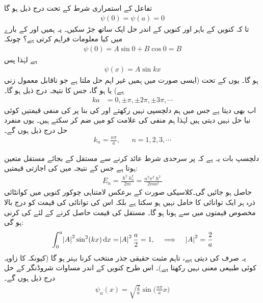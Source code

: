 تفاعل  کے استمراری شرط کے تحت درج ذیل ہو گا
\begin{align}
\psi(0)=\psi(a)=0
\end{align} 
تا کہ کنویں کے باہر اور کنویں کے اندر حل ایک ساتھ جڑ سکیں۔ یہ ہمیں اور کے بارے میں کیا معلومات فراہم کرتی ہے؟ چونکہ
\begin{align*}
\psi(0)=A\sin 0+B\cos 0=B
\end{align*}
ہے لہٰذا  پس
\begin{align}
\psi(x)=A\sin kx
\end{align}
ہو گا۔ یوں  کے تحت  (ایسی صورت میں ہمیں غیر اہم حل  ملتا ہے جو ناقابل معمول زنی ہے) یا  ہو گا، جس کا نتیجہ درج ذیل ہو گا۔
\begin{align}
ka&=0,\pm\pi,\pm2\pi,\pm3\pi,\cdots
\end{align} 
اب  بھی  دیتا ہے جس میں ہم دلچسپی نہیں رکھتے اور  کی بنا پر  کی منفی قیمتیں کوئی نیا حل نہیں دیتی ہیں لہٰذا ہم منفی کی علامت کو  میں ضم کر سکتے ہیں۔ یوں منفرد حل درج ذیل ہوں گے۔ 
\begin{align}
k_{n}=\frac{n\pi}{a},&& n=1,2,3,\cdots
\end{align}

دلچسپ بات یہ ہے کہ  پر سرحدی شرط عائد کرنے سے مستقل  کے بجائے مستقل متعین ہوتا ہے جس کے نتیجہ میں  کی اجازتی قیمتیں:
\begin{align}\label{مساوات_شروڈنگر_لامتناہی_چکور_کنواں_توانائیاں}
E_{n}=\frac{\hslash^2 k^{2}_{n}}{2m}=\frac{n^{2}\pi^{2}\hslash^{2}}{2ma^{2}}
\end{align} 
حاصل ہو جائیں گی۔کلاسیکی صورت کے برعکس لامتناہی چوکور کنویں میں کوانٹائی ذرہ ہر ایک توانائی کا حامل نہیں ہو سکتا ہے بلکہ اس کی توانائی کی قیمت کو درج بالا مخصوص  قیمتوں میں سے ہونا ہو گا۔ مستقل  کی قیمت حاصل کرنے کے لئے کی  کرنی ہو گی: 
\begin{align*}
\int_{0}^{a}\abs{A}^{2}\sin^{2}(kx)\dif{x}=\abs{A}^{2}\frac{a}{2}=1,\quad \implies\quad \abs{A}^{2}=\frac{2}{a}
\end{align*} 
یہ صرف  کی  دیتی ہے، تاہم مثبت حقیقی جذر  منتخب کرنا بہتر ہو گا (کیونکہ  کا زاویہ کوئی طبیعی معنی نہیں رکھتا ہے)۔ اس طرح کنویں کے اندر مساوات شروڈنگر کے حل درج ذیل ہوں گے۔
\begin{align}\label{مساوات_شروڈنگر_میری_سائے}
\psi_{n}(x)=\sqrt{\frac{2}{a}}\sin\big(\frac{n\pi}{a}x\big)
\end{align}

